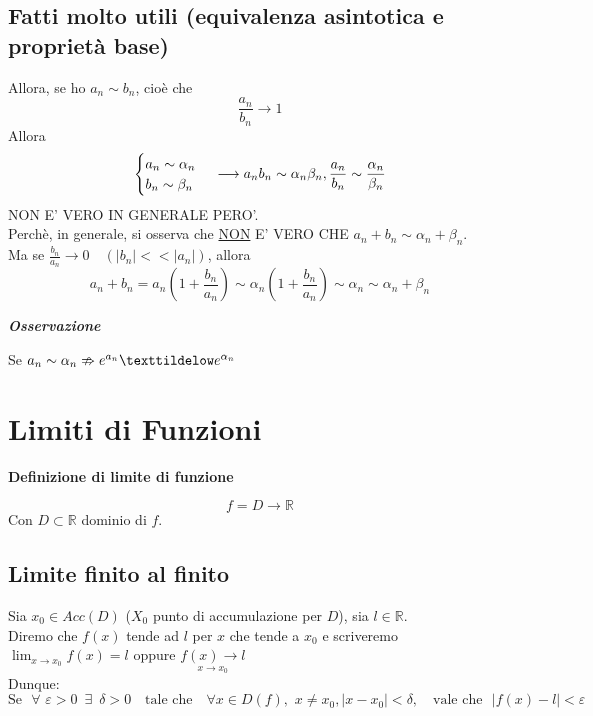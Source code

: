 \documentclass{article}
\theoremstyle{definition}
\newcommand{\R}{\mathbb{R}}
\begin{document}
\subsection{Fatti molto utili (equivalenza asintotica e proprietà base)}
Allora, se ho $a_n \sim b_n$, cioè che
\begin{equation}
    \frac{a_n}{b_n} \to 1
\end{equation}
Allora
\begin{equation}
    \begin{cases}
        a_n \sim \alpha_n \\
        b_n \sim \beta_n
    \end{cases}
    \\
    \longrightarrow a_nb_n \sim \alpha_n\beta_n, \frac{a_n}{b_n} \sim \frac{\alpha_n}{\beta_n}
\end{equation}
NON E' VERO IN GENERALE PERO'.
\\
Perchè, in generale, si osserva che \underline{NON} E' VERO CHE $a_n+b_n \sim \alpha_n+\beta_n$.
\\
Ma se $\frac{b_n}{a_n} \to 0 \,\,\,\,\,\, (|b_n|<< |a_n|)$, allora
\begin{equation}
    a_n+b_n=a_n(1+\frac{b_n}{a_n}) \sim \alpha_n(1+\frac{b_n}{a_n}) \sim \alpha_n \sim \alpha_n+\beta_n
\end{equation}
\begin{center}
    \textbf{\textit{Osservazione}}
\end{center}
Se $a_n \sim \alpha_n \nRightarrow e^{a_n} \texttildelow e^{\alpha_n}$

\newpage
\section{Limiti di Funzioni}
\begin{center}
\textbf{Definizione di limite di funzione}
\end{center}
    \begin{equation}
        f= D \to \mathbb{R}
    \end{equation}
    Con $D \subset \R$ dominio di $f$.
    \subsection{Limite finito al finito}
Sia $x_0 \in Acc(D)$ ($X_0$ punto di accumulazione per $D$), sia $l \in \R$.
\\
Diremo che $f(x)$ tende ad $l$ per $x$ che tende a $x_0$ e scriveremo $\lim_{x \to x_0} f(x) = l$ oppure $\underset{x \to {x_0}}{f(x) \to l}$
\\
Dunque:
\begin{equation}
    \mbox{Se} \,\,\,\, \forall \,\, \varepsilon > 0 \,\,\, \exists \,\,\, \delta > 0 \,\,\,\,\,\, \mbox{tale che} \,\,\,\,\,\, \forall x \in D(f), \,\, x \neq x_0, |x-x_0| < \delta, \,\,\,\,\,\, \mbox{vale che} \,\,\,\, |f(x)-l| < \varepsilon
\end{equation}
\end{document}
